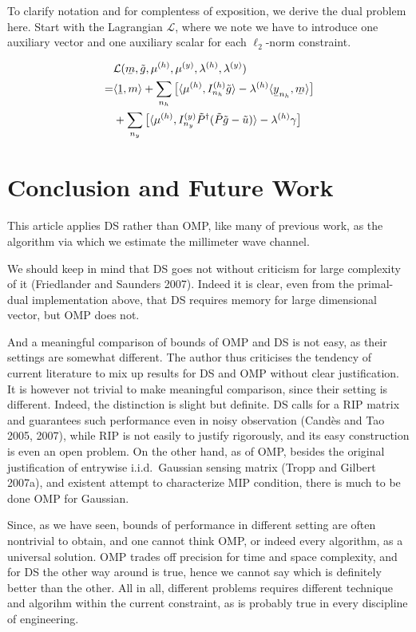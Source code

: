 \documentclass[12pt]{article}
\newcommand{\MC}[1]{\mathcal{#1}}
\newcommand{\V}[1]{\stackunder[1.2pt]{$#1$}{\rule{.9ex}{.075ex}}}
\newcommand{\T}[1]{\tilde{#1}}
\newcommand{\IP}[1]{\langle #1 \rangle}
\renewcommand{\H}{\dagger}
\begin{document}
To clarify notation and for complentess of exposition, we derive the dual problem here.
Start with the Lagrangian \(\MC{L}\), where we note we have to introduce one auxiliary vector and one auxiliary scalar for each \(\ell_2\)-norm constraint.

\begin{align}
   &\MC{L}(\V{m}, \T{g}, \mu^{(h)}, \mu^{(y)}, \lambda^{(h)}, \lambda^{(y)}) \notag \\
=& \IP{ \V{1}, m } 
   +\sum_{n_h} \big[ \IP{ \mu^{(h)}, I_{n_h}^{(h)} \T{g} } -\lambda^{(h)} \IP{ \V{y}_{n_h}, \V{m} } \big] \notag \\
\quad & +\sum_{n_y} \big[ \IP{ \mu^{(h)}, I_{n_y}^{(y)} \T{P}^\H ( \T{P} \T{g} -\T{u} ) } -\lambda^{(h)} \gamma \big]
\end{align}


\section{Conclusion and Future Work}

This article applies DS rather than OMP, like many of previous work, as the algorithm via which we estimate the millimeter wave channel.

We should keep in mind that DS goes not without criticism for large complexity of it (Friedlander and Saunders 2007).
Indeed it is clear, even from the primal-dual implementation above, that DS requires memory for large dimensional vector, but OMP does not.

And a meaningful comparison of bounds of OMP and DS is not easy, as their settings are somewhat different.
The author thus criticises the tendency of current literature to mix up results for DS and OMP without clear justification.
It is however not trivial to make meaningful comparison, since their setting is different.
Indeed, the distinction is slight but definite.
DS calls for a RIP matrix and guarantees such performance even in noisy observation (Cand\`es and Tao 2005, 2007), while RIP is not easily to justify rigorously, and its easy construction is even an open problem.
On the other hand, as of OMP, besides the original justification of entrywise i.i.d.\ Gaussian sensing matrix (Tropp and Gilbert 2007a), and existent attempt to characterize MIP condition, there is much to be done OMP for Gaussian.

Since, as we have seen, bounds of performance in different setting are often nontrivial to obtain, and one cannot think OMP, or indeed every algorithm, as a universal solution.
OMP trades off precision for time and space complexity, and for DS the other way around is true, hence we cannot say which is definitely better than the other.
All in all, different problems requires different technique and algorihm within the current constraint, as is probably true in every discipline of engineering.
\end{document}
